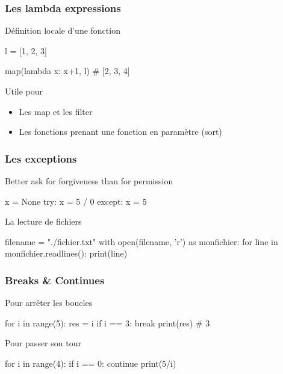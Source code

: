\documentclass{beamer}
\begin{document}
\begin{frame}[fragile]
  \frametitle{Les lambda expressions}
  \begin{block}{Définition locale d'une fonction}
    \begin{python}
l = [1, 2, 3]

map(lambda x: x+1, l) # [2, 3, 4]
    \end{python}
  \end{block}

  \begin{block}{Utile pour}
    \begin{itemize}
    \item Les map et les filter
    \item Les fonctions prenant une fonction en paramètre (sort)
    \end{itemize}
  \end{block}

\end{frame}

\begin{frame}[fragile]
  \frametitle{Les exceptions}

  \begin{block}{Better ask for forgiveness than for permission}
    \begin{python}
x = None
try:
  x = 5 / 0
except:
  x = 5
    \end{python}
  \end{block}

  \begin{block}{La lecture de fichiers}
    \begin{python}
filename = "./fichier.txt"
with open(filename, 'r') as monfichier:
  for line in monfichier.readlines():
    print(line)
    \end{python}
  \end{block}

\end{frame}

\begin{frame}[fragile]
  \frametitle{Breaks \& Continues}

  \begin{block}{Pour arrêter les boucles}
    \begin{python}
for i in range(5):
  res = i
  if i == 3:
    break
print(res) # 3
    \end{python}
  \end{block}

  \begin{block}{Pour passer son tour}
    \begin{python}
for i in range(4):
  if i == 0:
    continue
  print(5/i)
    \end{python}
  \end{block}

\end{frame}
\end{document}
